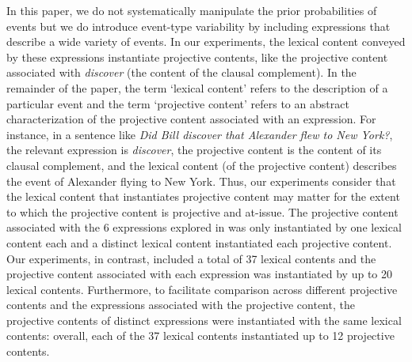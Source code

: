 \documentclass[11pt,fleqn]{article}
\newcommand{\6}{\mbox{$[\hspace*{-.6mm}[$}}
\newcommand{\9}{\mbox{$]\hspace*{-.6mm}]$}}
\begin{document}
In this paper, we do not systematically manipulate the prior probabilities of events but we do introduce event-type variability by including expressions that describe a wide variety of events. In our experiments, the lexical content conveyed by these expressions instantiate projective contents, like the projective content associated with {\em discover} (the content of the clausal complement). In the remainder of the paper, the term `lexical content' refers to the description of a particular event and the term `projective content' refers to an abstract characterization of the projective content associated with an expression. For instance, in  a sentence like {\em Did Bill discover that Alexander flew to New York?}, the relevant expression is {\em discover}, the projective content is the content of its clausal complement, and the lexical content (of the projective content) describes the event of Alexander flying to New York.  Thus, our experiments consider that the lexical content that instantiates projective content may matter for the extent to which the projective content is projective and at-issue. The projective content associated with the 6 expressions explored in \citealt{smith-hall11} was only instantiated by one lexical content each and a distinct lexical content instantiated each projective content. Our experiments, in contrast, included a total of 37 lexical contents and the projective content associated with each expression was instantiated by up to 20 lexical contents. Furthermore, to facilitate comparison across different projective contents and the expressions associated with the projective content, the projective contents of distinct expressions were instantiated with the same lexical contents: overall, each of the 37 lexical contents instantiated up to 12 projective contents.
\end{document}
